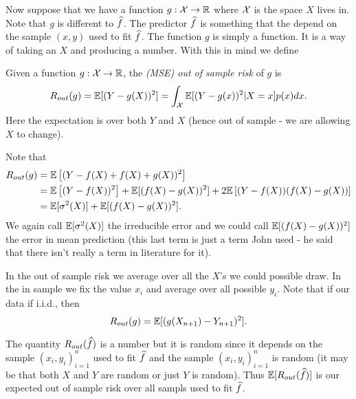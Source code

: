 Now suppose that we have a function $g:{\mathcal{X}} \to {\mathbb R}$ where ${\mathcal{X}}$ is the space $X$ lives in. Note that $g$ is different to $\widehat{f}$. The predictor $\widehat{f}$ is something that the depend on the sample $(x,y)$ used to fit $\widehat{f}$. The function $g$ is simply a function. It is a way of taking an $X$ and producing a number. With this in mind we define
\begin{defn}
    Given a function $g : {\mathcal{X}} \to {\mathbb R}$, the \emph{(MSE) out of sample risk} of $g$ is
    \[R_{out}(g) = {\mathbb{E}}[(Y-g(X))^2] = \int_{\mathcal{X}} {\mathbb{E}}[(Y-g(x))^2|X=x]p(x)dx. \]
    Here the expectation is over both $Y$ and $X$ (hence out of sample - we are allowing $X$ to change).
\end{defn}
Note that 
\begin{align*}
    R_{out}(g) &= {\mathbb{E}}\left[(Y-f(X)+f(X)+g(X))^2\right]\\
&={\mathbb{E}}\left[(Y-f(X))^2\right]+{\mathbb{E}}[(f(X)-g(X))^2]+2{\mathbb{E}}\left[(Y-f(X))(f(X)-g(X))\right]\\
&={\mathbb{E}}[\sigma^2(X)]+{\mathbb{E}}[(f(X)-g(X))^2].
\end{align*}
We again call ${\mathbb{E}}[\sigma^2(X)]$ the irreducible error and we could call ${\mathbb{E}}[(f(X)-g(X))^2]$ the error in mean prediction (this last term is just a term John used - he said that there isn't really a term in literature for it).

In the out of sample risk we average over all the $X$'s we could possible draw. In the in sample we fix the value $x_i$ and average over all possible $y_i$. Note that if our data if i.i.d., then 
\[R_{out}(g) = {\mathbb{E}}[(g(X_{n+1})-Y_{n+1})^2]. \]

 The quantity $R_{out}(\widehat{f})$ is a number but it is random since it depends on the sample $(x_i,y_i)_{i=1}^n$ used to fit $\widehat{f}$ and the sample $(x_i,y_i)_{i=1}^n$ is random (it may be that both $X$ and $Y$ are random or just $Y$ is random). Thus ${\mathbb{E}}[R_{out}(\widehat{f})]$ is our expected out of sample risk over all sampls used to fit $\widehat{f}$.
 
